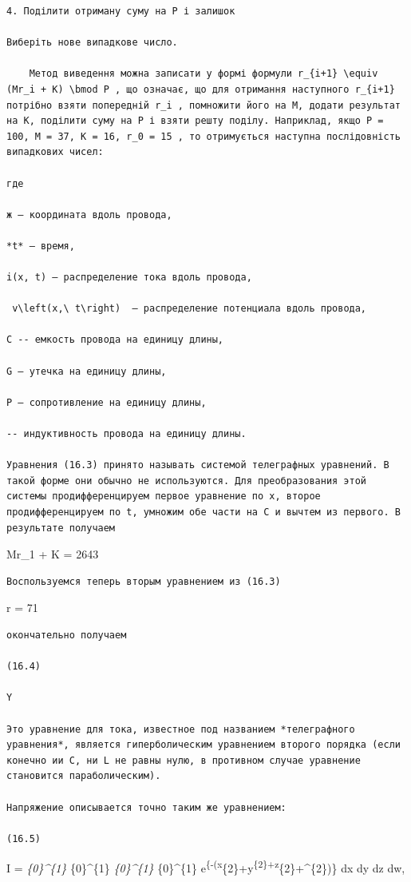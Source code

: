 \documentclass[
  ukrainian,
]{article}
\begin{document}
\begin{verbatim}
4. Поділити отриману суму на P і залишок

Виберіть нове випадкове число.

    Метод виведення можна записати у формі формули r_{i+1} \equiv (Mr_i + K) \bmod P , що означає, що для отримання наступного r_{i+1} потрібно взяти попередній r_i , помножити його на M, додати результат на K, поділити суму на P і взяти решту поділу. Наприклад, якщо P = 100, M = 37, K = 16, r_0 = 15 , то отримується наступна послідовність випадкових чисел:

где

ж — координата вдоль провода,

*t* — время,

i(x, t) — распределение тока вдоль провода,

 v\left(x,\ t\right)  — распределение потенциала вдоль провода,

С -- емкость провода на единицу длины,

G — утечка на единицу длины,

Р — сопротивление на единицу длины,

-- индуктивность провода на единицу длины.

Уравнения (16.3) принято называть системой телеграфных уравнений. В такой форме они обычно не используются. Для преобразования этой системы продифференцируем первое уравнение по x, второе продифференцируем по t, умножим обе части на C и вычтем из первого. В результате получаем
\end{verbatim}

Mr\_1 + K = 2643

\begin{verbatim}
Воспользуемся теперь вторым уравнением из (16.3)
\end{verbatim}

r = 71

\begin{verbatim}
окончательно получаем

(16.4)

Y

Это уравнение для тока, известное под названием *телеграфного уравнения*, является гиперболическим уравнением второго порядка (если конечно ии C, ни L не равны нулю, в противном случае уравнение становится параболическим).

Напряжение описывается точно таким же уравнением:

(16.5)
\end{verbatim}

I = \int\emph{\{0\}\^{}\{1\} \int}\{0\}\^{}\{1\}
\int\emph{\{0\}\^{}\{1\} \int}\{0\}\^{}\{1\}
e\textsuperscript{\{-(x}\{2\}+y\textsuperscript{\{2\}+z}\{2\}+\omega\^{}\{2\})\}
dx dy dz dw,
\end{document}
